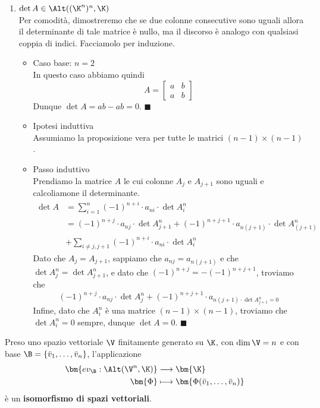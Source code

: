 \documentclass[11pt, a4paper, titlepage, oneside]{scrbook}
\begin{document}
\begin{enumerate}[label=\arabic*°]
    \item $\det A \in \Alt((\K^n)^n, \K)$ \\
    Per comodità, dimostreremo che se due colonne consecutive sono uguali allora il determinante di tale matrice è nullo, ma il discorso è analogo con qualsiasi coppia di indici. Facciamolo per induzione.
    \begin{itemize}
        \item Caso base: $n = 2$ \\
        In questo caso abbiamo quindi
        \[ A = 
        \begin{bmatrix}
        a & b \\
        a & b
        \end{bmatrix}
        \]
        Dunque $\det A = ab - ab = 0$. $\blacksquare$
        \item Ipotesi induttiva \\
        Assumiamo la proposizione vera per tutte le matrici $(n-1) \times (n-1)$.
        \item Passo induttivo \\
        Prendiamo la matrice $A$ le cui colonne $A_j$ e $A_{j+1}$ sono uguali e calcoliamone il determinante. 
        \begin{align*}
        \det A &= \sum_{i = 1}^n (-1)^{n+i} \cdot a_{ni} \cdot \det A^n_i \\
         &= (-1)^{n+j} \cdot a_{nj} \cdot \det A^n_{j+1} + (-1)^{n+j+1} \cdot a_{n(j+1)} \cdot \det A^n_(j+1)  \\
         &+ \sum_{i \neq j, j+1} (-1)^{n+i} \cdot a_{ni} \cdot \det A^n_i
        \end{align*}
        Dato che $A_j = A_{j+1}$, sappiamo che $a_{nj} = a_{n(j+1)}$ e che $\det A^n_j = \det A^n_{j+1}$, e dato che $(-1)^{n+j} = - (-1)^{n+j+1}$, troviamo che
        \[
        (-1)^{n+j} \cdot a_{nj} \cdot \det A^n_j + (-1)^{n+j+1} \cdot a_{n(j+1) \cdot \det A^n_{j+1} = 0}
        \] 
        Infine, dato che $A^n_i$ è una matrice $(n-1) \times (n-1)$, troviamo che $\det A^n_i = 0$ sempre, dunque $\det A = 0$. $\blacksquare$
    \end{itemize}
\end{enumerate}

\begin{Proposizione}[]
\label{propos-ev_B isomorfismo}
Preso uno spazio vettoriale $\V$ finitamente generato su $\K$, con $\dim \V = n$ e con base \mbox{$\B = \{\bar{v}_1, \ldots, \bar{v}_n\}$}, l'applicazione
\begin{align*}
\bm{ev_\B: \Alt(\V^n, \K)} &\longrightarrow \bm{\K} \\
\bm{\Phi} &\longmapsto \bm{\Phi(\bar{v}_1, \ldots, \bar{v}_n)} 
\end{align*}
è un \textbf{isomorfismo di spazi vettoriali}.
\end{Proposizione}
\end{document}
